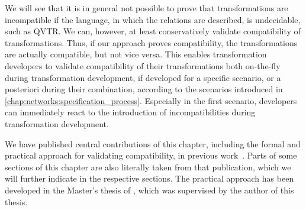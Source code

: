 
We will see that it is in general not possible to prove that transformations are incompatible if the language, in which the relations are described, is undecidable, such as \gls{QVTR}.
We can, however, at least conservatively validate compatibility of transformations.
Thus, if our approach proves compatibility, the transformations are actually compatible, but not vice versa.
This enables transformation developers to validate compatibility of their transformations both on-the-fly during transformation development, if developed for a specific scenario, or a posteriori during their combination, according to the scenarios introduced in \autoref{chap:networks:specification_process}.
Especially in the first scenario, developers can immediately react to the introduction of incompatibilities during transformation development.

We have published central contributions of this chapter, including the formal and practical approach for validating compatibility, in previous work~.
Parts of some sections of this chapter are also literally taken from that publication, which we will further indicate in the respective sections.
The practical approach has been developed in the Master's thesis of \textcite{pepin2019ma}, which was supervised by the author of this thesis.





